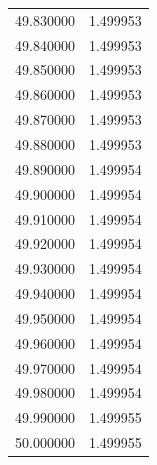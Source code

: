 \begin{tabular}{rr}
49.830000 & 1.499953 \\
49.840000 & 1.499953 \\
49.850000 & 1.499953 \\
49.860000 & 1.499953 \\
49.870000 & 1.499953 \\
49.880000 & 1.499953 \\
49.890000 & 1.499954 \\
49.900000 & 1.499954 \\
49.910000 & 1.499954 \\
49.920000 & 1.499954 \\
49.930000 & 1.499954 \\
49.940000 & 1.499954 \\
49.950000 & 1.499954 \\
49.960000 & 1.499954 \\
49.970000 & 1.499954 \\
49.980000 & 1.499954 \\
49.990000 & 1.499955 \\
50.000000 & 1.499955 \\
\bottomrule
\end{tabular}

